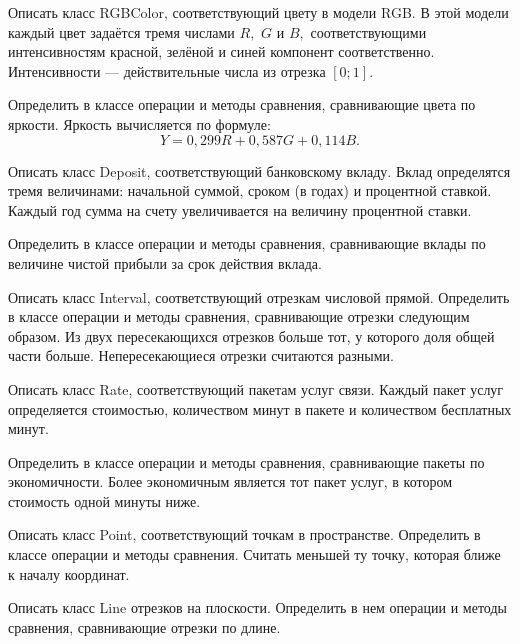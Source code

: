 \task Описать класс RGBColor, соответствующий цвету в модели RGB. В
этой модели каждый цвет задаётся тремя числами $R,$ $G$ и $B,$
соответствующими интенсивностям красной, зелёной и синей компонент
соответственно. Интенсивности — действительные числа из отрезка
$[0; 1]$.

Определить в классе операции и методы сравнения, сравнивающие цвета по
яркости. Яркость вычисляется по формуле:
\[
Y = 0{,}299 R + 0{,}587 G + 0{,}114 B.
\]

\task Описать класс Deposit, соответствующий банковскому вкладу. Вклад
определятся тремя величинами: начальной суммой, сроком (в годах) и
процентной ставкой. Каждый год сумма на счету увеличивается на
величину процентной ставки.

Определить в классе операции и методы сравнения, сравнивающие вклады
по величине чистой прибыли за срок действия вклада.

\task Описать класс Interval, соответствующий отрезкам числовой
прямой. Определить в классе операции и методы сравнения, сравнивающие
отрезки следующим образом. Из двух пересекающихся отрезков больше тот,
у которого доля общей части больше. Непересекающиеся отрезки считаются
разными.

\task Описать класс Rate, соответствующий пакетам услуг связи. Каждый
пакет услуг определяется стоимостью, количеством минут в пакете и
количеством бесплатных минут.

Определить в классе операции и методы сравнения, сравнивающие пакеты
по экономичности. Более экономичным является тот пакет услуг, в
котором стоимость одной минуты ниже.

\task Описать класс Point, соответствующий точкам в пространстве.
Определить в классе операции и методы сравнения. Считать меньшей ту
точку, которая ближе к началу координат.

\task Описать класс Line отрезков на плоскости. Определить в нем
операции и методы сравнения, сравнивающие отрезки по длине.
